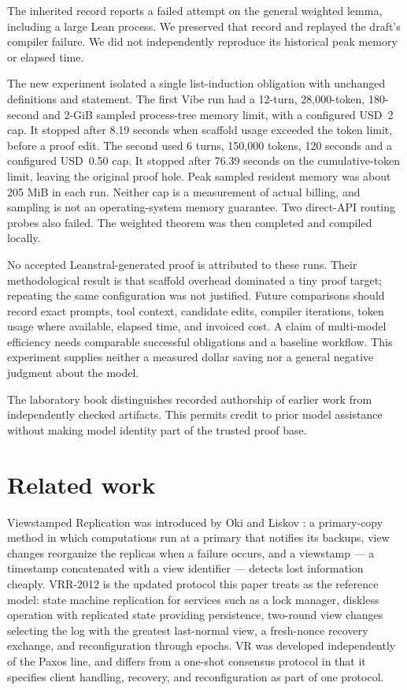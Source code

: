 \documentclass[10pt,journal,letterpaper]{IEEEtran}
\begin{document}
The inherited record reports a failed attempt on the general weighted lemma,
including a large Lean process. We preserved that record and replayed the
draft's compiler failure. We did not independently reproduce its historical
peak memory or elapsed time.

The new experiment isolated a single list-induction obligation with unchanged
definitions and statement. The first Vibe run had a 12-turn, 28,000-token,
180-second and 2-GiB sampled process-tree memory limit, with a configured
USD~2 cap. It stopped after 8.19 seconds when scaffold usage exceeded the
token limit, before a proof edit. The second used 6 turns, 150,000 tokens,
120 seconds and a configured USD~0.50 cap. It stopped after 76.39 seconds on
the cumulative-token limit, leaving the original proof hole. Peak sampled
resident memory was about 205 MiB in each run. Neither cap is a measurement
of actual billing, and sampling is not an operating-system memory guarantee.
Two direct-API routing probes also failed. The weighted theorem was then
completed and compiled locally.

No accepted Leanstral-generated proof is attributed to these runs. Their
methodological result is that scaffold overhead dominated a tiny proof target;
repeating the same configuration was not justified. Future comparisons should
record exact prompts, tool context, candidate edits, compiler iterations,
token usage where available, elapsed time, and invoiced cost. A claim of
multi-model efficiency needs comparable successful obligations and a baseline
workflow. This experiment supplies neither a measured dollar saving nor a
general negative judgment about the model.

The laboratory book distinguishes recorded authorship of earlier work
from independently checked artifacts. This permits credit to prior model
assistance without making model identity part of the trusted proof base.

\section{Related work}\label{sec:related}
Viewstamped Replication was introduced by Oki and Liskov \cite{vsr}: a
primary-copy method in which computations run at a primary that notifies its
backups, view changes reorganize the replicas when a failure occurs, and a
viewstamp --- a timestamp concatenated with a view identifier --- detects
lost information cheaply. VRR-2012 \cite{vrr} is the updated protocol this
paper treats as the reference model: state machine replication for services
such as a lock manager, diskless operation with replicated state providing
persistence, two-round view changes selecting the log with the greatest
last-normal view, a fresh-nonce recovery exchange, and reconfiguration
through epochs. VR was developed independently of the Paxos line, and differs
from a one-shot consensus protocol in that it specifies client handling,
recovery, and reconfiguration as part of one protocol.
\end{document}
